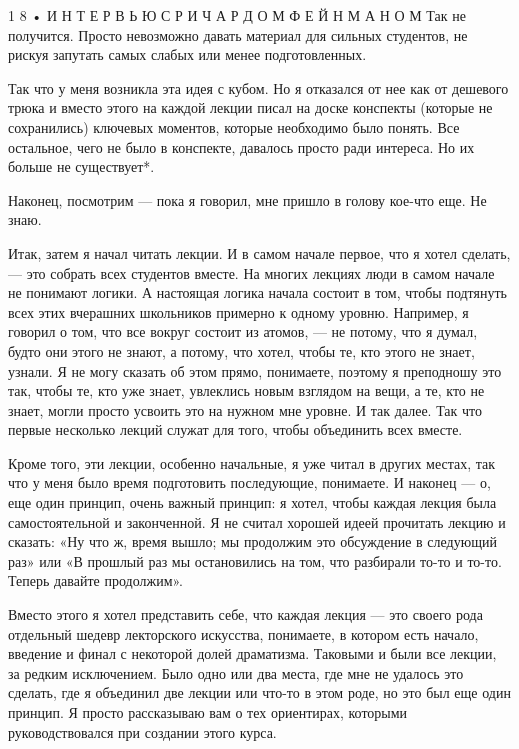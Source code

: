 \documentclass[11pt,oneside]{article}
\begin{document}
1 8 • И Н Т Е Р В Ь Ю  С  Р И Ч А Р Д О М  Ф Е Й Н М А Н О М Так не получится. Просто невозможно давать материал для сильных студентов, не рискуя запутать самых слабых или менее подготовленных.\par



Так что у меня возникла эта идея с кубом. Но я отказался от нее как от дешевого трюка и вместо этого на каждой лекции писал на доске конспекты (которые не сохранились) ключевых моментов, которые необходимо было понять. Все остальное, чего не было в конспекте, давалось просто ради интереса. Но их больше не существует*.\par



Наконец, посмотрим --- пока я говорил, мне пришло в голову кое-что еще. Не знаю.\par



Итак, затем я начал читать лекции. И в самом начале первое, что я хотел сделать, --- это собрать всех студентов вместе. На многих лекциях люди в самом начале не понимают логики. А настоящая логика начала состоит в том, чтобы подтянуть всех этих вчерашних школьников примерно к одному уровню. Например, я говорил о том, что все вокруг состоит из атомов, --- не потому, что я думал, будто они этого не знают, а потому, что хотел, чтобы те, кто этого не знает, узнали. Я не могу сказать об этом прямо, понимаете, поэтому я преподношу это так, чтобы те, кто уже знает, увлеклись новым взглядом на вещи, а те, кто не знает, могли просто усвоить это на нужном мне уровне. И так далее. Так что первые несколько лекций служат для того, чтобы объединить всех вместе.\par



Кроме того, эти лекции, особенно начальные, я уже читал в других местах, так что у меня было время подготовить последующие, понимаете. И наконец --- о, еще один принцип, очень важный принцип: я хотел, чтобы каждая лекция была самостоятельной и законченной. Я не считал хорошей идеей прочитать лекцию и сказать: «Ну что ж, время вышло; мы продолжим это обсуждение в следующий раз» или «В прошлый раз мы остановились на том, что разбирали то-то и то-то. Теперь давайте продолжим».\par



Вместо этого я хотел представить себе, что каждая лекция --- это своего рода отдельный шедевр лекторского искусства, понимаете, в котором есть начало, введение и финал с некоторой долей драматизма. Таковыми и были все лекции, за редким исключением. Было одно или два места, где мне не удалось это сделать, где я объединил две лекции или что-то в этом роде, но это был еще один принцип. Я просто рассказываю вам о тех ориентирах, которыми руководствовался при создании этого курса.\par
\end{document}
